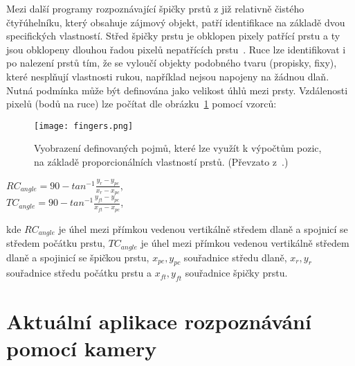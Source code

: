 Mezi další programy rozpoznávající špičky prstů z již relativně čistého čtyřúhelníku, který obsahuje zájmový objekt, patří identifikace na základě dvou specifických vlastností. Střed špičky prstu je obklopen pixely patřící prstu a ty jsou obklopeny dlouhou řadou pixelů nepatřících prstu~\cite{14}. Ruce lze identifikovat i po nalezení prstů tím, že se vyloučí objekty podobného tvaru (propisky, fixy), které nesplňují vlastnosti rukou, například nejsou napojeny na žádnou dlaň. Nutná podmínka může být definována jako velikost úhlů mezi prsty. Vzdálenosti pixelů (bodů na ruce) lze počítat dle obrázku~\ref{pic8} pomocí vzorců: 

\begin{figure}[h]
\centering
\texttt{[image: fingers.png]}
\caption{Vyobrazení definovaných pojmů, které lze využít k výpočtům pozic, na základě proporcionálních vlastností prstů.
(Převzato z~\cite{13}.) }
\label{pic8}
\end{figure}

\begin{center}
$RC_{angle} = 90 - tan^{-1} \frac{y_{r}-y_{pc}}{x_{r} - x_{pc}}$, \\
$TC_{angle} = 90 - tan^{-1} \frac{y_{ft}-y_{pc}}{x_{ft} - x_{pc}}$, 
\end{center}
kde $ RC_{angle} $ je úhel mezi přímkou vedenou vertikálně středem dlaně a spojnicí se středem počátku prstu, $ TC_{angle} $ je úhel mezi přímkou vedenou vertikálně středem dlaně a spojinicí se špičkou prstu, $ x_{pc}, y_{pc} $ souřadnice středu dlaně, $ x_{r}, y_{r} $ souřadnice středu počátku prstu a $ x_{ft}, y_{ft} $ souřadnice špičky prstu.

\newpage
\section{Aktuální aplikace rozpoznávání pomocí kamery}
